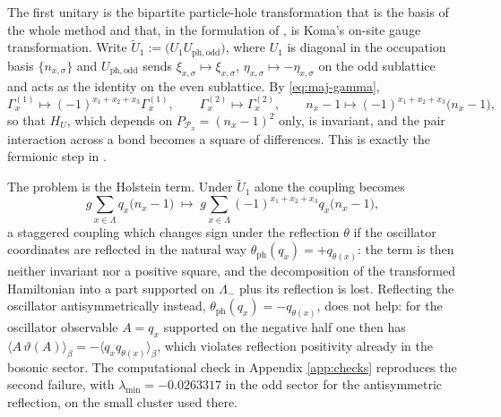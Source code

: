 \documentclass[11pt]{article}
\numberwithin{equation}{section}
\newcommand{\Lamb}{\Lambda}
\newcommand{\ph}{\mathrm{ph}}
\newcommand{\Gam}{\Gamma}
\theoremstyle{definition}
\begin{document}
The first unitary is the bipartite particle-hole transformation that is the basis of
the whole method and that, in the formulation of \cite{koma2022}, is Koma's on-site
gauge transformation. Write $\tilde U_{1}:=\big(U_{1}U_{\ph,\text{odd}}\big)$, where
$U_{1}$ is diagonal in the occupation basis $\{n_{x,\sigma}\}$ and $U_{\ph,\text{odd}}$
sends $\xi_{x,\sigma}\mapsto\xi_{x,\sigma}$, $\eta_{x,\sigma}\mapsto-\eta_{x,\sigma}$ on
the odd sublattice and acts as the identity on the even sublattice. By \eqref{eq:maj-gamma},
\begin{equation}
\Gam^{(1)}_{x}\longmapsto(-1)^{x_{1}+x_{2}+x_{3}}\Gam^{(1)}_{x},\qquad
\Gam^{(2)}_{x}\longmapsto\Gam^{(2)}_{x},\qquad
n_{x}-1\longmapsto(-1)^{x_{1}+x_{2}+x_{3}}\big(n_{x}-1\big),
\label{eq:gammamap}
\end{equation}
so that $H_{U}$, which depends on $P_{\mathcal{P}_{x}}=(n_{x}-1)^{2}$ only, is
invariant, and the pair interaction across a bond becomes a square of differences.
This is exactly the fermionic step in \cite{rens2026pkodlro}.

The problem is the Holstein term. Under $\tilde U_{1}$ alone the coupling becomes
\begin{equation}
g\sum_{x\in\Lamb}q_{x}\big(n_{x}-1\big)
\;\longmapsto\;
g\sum_{x\in\Lamb}(-1)^{x_{1}+x_{2}+x_{3}}q_{x}\big(n_{x}-1\big),
\end{equation}
a staggered coupling which changes sign under the reflection $\theta$ if the oscillator
coordinates are reflected in the natural way $\theta_{\ph}(q_{x})=+q_{\theta(x)}$:
the term is then neither invariant nor a positive square, and the decomposition of the
transformed Hamiltonian into a part supported on $\Lamb_{-}$ plus its reflection is
lost. Reflecting the oscillator antisymmetrically instead,
$\theta_{\ph}(q_{x})=-q_{\theta(x)}$, does not help: for the oscillator observable
$A=q_{x}$ supported on the negative half one then has
$\langle A\,\vartheta(A)\rangle_{\beta}=-\langle q_{x}q_{\theta(x)}\rangle_{\beta}$,
which violates reflection positivity already in the bosonic sector. The computational
check in Appendix \ref{app:checks} reproduces the second failure, with
$\lambda_{\min}=-0.0263317$ in the odd sector for the antisymmetric reflection, on the
small cluster used there.
\end{document}

